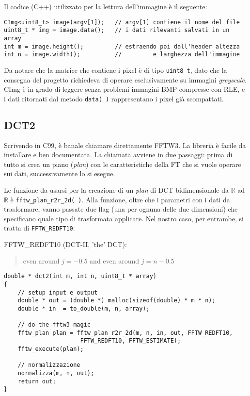 \documentclass[11pt,a4paper]{scrartcl}
\begin{document}
Il codice (C++) utilizzato per la lettura dell'immagine è il seguente:

\begin{verbatim}
CImg<uint8_t> image(argv[1]);   // argv[1] contiene il nome del file
uint8_t * img = image.data();   // i dati rilevanti salvati in un array
int m = image.height();         // estraendo poi dall'header altezza
int n = image.width();          //         e larghezza dell'immagine
\end{verbatim}

Da notare che la matrice che contiene i pixel è di tipo \texttt{uint8\_t}, dato che la consegna del progetto richiedeva di operare esclusivamente su immagini \emph{greyscale}. CImg è in grado di leggere senza problemi immagini BMP compresse con RLE, e i dati ritornati dal metodo \texttt{data( )} rappresentano i pixel già scompattati.

\subsection*{DCT2}

Scrivendo in C99, è banale chiamare direttamente FFTW3. La libreria è facile da installare e ben documentata. La chiamata avviene in due passaggi: prima di tutto si crea un piano (\emph{plan}) con le caratteristiche della FT che si vuole operare sui dati, successivamente lo si esegue.

Le funzione da usarsi per la creazione di un \emph{plan} di DCT bidimensionale da $\mathbb{R}$ ad $\mathbb{R}$ è \texttt{fftw\_plan\_r2r\_2d( )}. Alla funzione, oltre che i parametri con i dati da trasformare, vanno passate due flag (una per ognuna delle due dimensioni) che specificano quale tipo di trasformata applicare. Nel nostro caso, per entrambe, si tratta di \texttt{FFTW\_REDFT10}:

FFTW\_REDFT10 (DCT-II, 'the' DCT):
\begin{quotation}
even around $j=-0.5$ and even around $j=n-0.5$
\end{quotation}

\begin{verbatim}
double * dct2(int m, int n, uint8_t * array)
{
    // setup input e output
    double * out = (double *) malloc(sizeof(double) * m * n);
    double * in  = to_double(m, n, array);

    // do the fftw3 magic
    fftw_plan plan = fftw_plan_r2r_2d(m, n, in, out, FFTW_REDFT10,
				      FFTW_REDFT10, FFTW_ESTIMATE);
    fftw_execute(plan);

    // normalizzazione
    normalizza(m, n, out);
    return out;
}
\end{verbatim}
\end{document}
